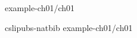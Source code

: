 
\begingroup %

 {example-ch01/}{ch01}     %

 {cslipubs-natbib}
 {example-ch01/ch01}  %

\endgroup

